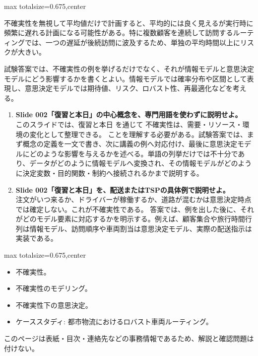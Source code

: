 \begin{adjustbox}{max totalsize={\textwidth}{0.675\textheight},center}
\begin{minipage}{\textwidth}
\begin{minipage}[t]{0.485\textwidth}
不確実性を無視して平均値だけで計画すると、平均的には良く見えるが実行時に頻繁に遅れる計画になる可能性がある。特に複数顧客を連続して訪問するルーティングでは、一つの遅延が後続訪問に波及するため、単独の平均時間以上にリスクが大きい。\par
試験答案では、不確実性の例を挙げるだけでなく、それが情報モデルと意思決定モデルにどう影響するかを書くとよい。情報モデルでは確率分布や区間として表現し、意思決定モデルでは期待値、リスク、ロバスト性、再最適化などを考える。\par
{}
\begin{enumerate}
\item \textbf{Slide 002「復習と本日」の中心概念を、専門用語を使わずに説明せよ。}\\このスライドでは、復習と本日 を通じて 不確実性は、需要・リソース・環境の変化として整理できる。 ことを理解する必要がある。試験答案では、まず概念の定義を一文で書き、次に講義の例へ対応付け、最後に意思決定モデルにどのような影響を与えるかを述べる。単語の列挙だけでは不十分であり、データがどのように情報モデルへ変換され、その情報モデルがどのように決定変数・目的関数・制約へ接続されるかまで説明する。
\item \textbf{Slide 002「復習と本日」を、配送またはTSPの具体例で説明せよ。}\\注文がいつ来るか、ドライバーが稼働するか、道路が混むかは意思決定時点では確定しない。これが不確実性である。 答案では、例を出した後に、それがどのモデル要素に対応するかを明示する。例えば、顧客集合や旅行時間行列は情報モデル、訪問順序や車両割当は意思決定モデル、実際の配送指示は実装である。
\end{enumerate}
\end{minipage}
\end{minipage}
\end{adjustbox}

\clearpage
{}
\begin{adjustbox}{max totalsize={\textwidth}{0.675\textheight},center}
\begin{minipage}{\textwidth}\scriptsize
\begin{minipage}[t]{0.485\textwidth}
\begin{itemize}
\item 不確実性。
\item 不確実性のモデリング。
\item 不確実性下の意思決定。
\item ケーススタディ: 都市物流におけるロバスト車両ルーティング。
\end{itemize}
\end{minipage}\hfill
\begin{minipage}[t]{0.485\textwidth}
{\small このページは表紙・目次・連絡先などの事務情報であるため、解説と確認問題は付けない。}
\end{minipage}
\end{minipage}
\end{adjustbox}

